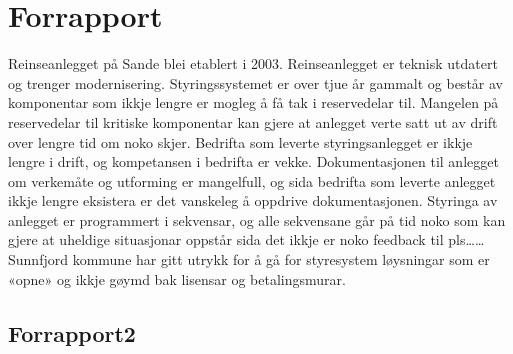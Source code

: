 
\chapter{Forrapport}
\thispagestyle{fancy}
Reinseanlegget på Sande blei etablert i 2003. Reinseanlegget er teknisk utdatert og trenger modernisering. 
Styringssystemet er over tjue år gammalt og består av komponentar som ikkje lengre er mogleg å få tak i reservedelar til. 
Mangelen på reservedelar til kritiske komponentar kan gjere at anlegget verte satt ut av drift over lengre tid om noko skjer. 
Bedrifta som leverte styringsanlegget er ikkje lengre i drift, og kompetansen i bedrifta er vekke. 
Dokumentasjonen til anlegget om verkemåte og utforming er mangelfull, og sida bedrifta som leverte anlegget ikkje lengre eksistera er det vanskeleg å oppdrive dokumentasjonen.
Styringa av anlegget er programmert i sekvensar, og alle sekvensane går på tid noko som kan gjere at uheldige situasjonar oppstår sida det ikkje er noko feedback til pls……
Sunnfjord kommune har gitt utrykk for å gå for styresystem løysningar som er «opne» og ikkje gøymd bak lisensar og betalingsmurar.

\section{Forrapport2}

    